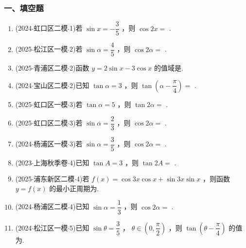 \subsubsection*{一、填空题}
\begin{enumerate}
    \item (2024$\cdot$虹口区二模$\cdot$1)若 $\sin x =  - \dfrac{3}{5}$ ，则 $\cos {2x} =$ .

    \item (2025$\cdot$松江区一模$\cdot$2)若 $\sin \alpha  = \dfrac{4}{5}$ ，则 $\cos {2\alpha } =$ .

    \item (2025$\cdot$青浦区二模$\cdot$2)函数 $y = 2\sin x - 3\cos x$ 的值域是.

    \item (2024$\cdot$宝山区二模$\cdot$2)已知 $\tan \alpha  = 3$ ，则 $\tan \left( {\alpha  - \dfrac{\pi }{4}}\right)  =$ .

    \item (2025$\cdot$虹口区一模$\cdot$3)若 $\tan \alpha  = 5$ ，则 $\tan {2\alpha } =$ .

    \item (2025$\cdot$虹口区二模$\cdot$3)若 $\sin \alpha  = \dfrac{2}{3}$ ，则 $\cos {2\alpha } =$ .

    \item (2024$\cdot$杨浦区一模$\cdot$3)若 $\sin \alpha  = \dfrac{3}{5}$ ，则 $\cos {2\alpha } =$ .

    \item (2023$\cdot$上海秋季卷$\cdot$4)已知 $\tan A = 3$ ，则 $\tan {2A} =$ .

    \item (2025$\cdot$浦东新区二模$\cdot$4)若 $f\left( x\right)  = \cos {3x}\cos x + \sin {3x}\sin x$ ，则函数 $y = f\left( x\right)$ 的最小正周期为\blkda[2]{$\pi$}.

    \item (2024$\cdot$杨浦区二模$\cdot$4)已知 $\sin \alpha  = \dfrac{1}{3}$ ，则 $\cos {2\alpha } =$ .

    \item (2024$\cdot$松江区一模$\cdot$5)已知 $\sin \theta  = \dfrac{3}{5}$ ， $\theta  \in  \left( {0,\dfrac{\pi }{2}}\right)$ ，则 $\tan \left( {\theta  - \dfrac{\pi }{4}}\right)$ 的值为.


\end{enumerate}
